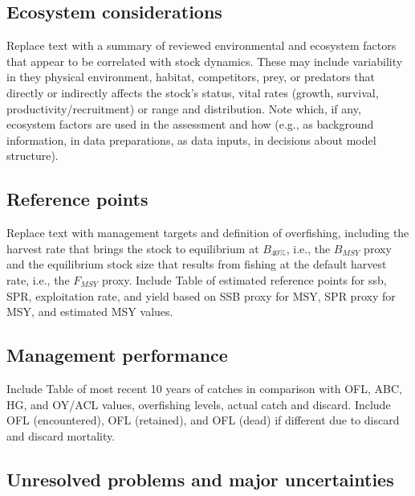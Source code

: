 \documentclass[11pt,
  english,
  letterpaper,
]{article}
\begin{document}
\hypertarget{ecosystem-considerations}{%
\subsection*{Ecosystem considerations}\label{ecosystem-considerations}}

Replace text with a summary of reviewed environmental and ecosystem factors that appear to be correlated with stock dynamics. These may include variability in they physical environment, habitat, competitors, prey, or predators that directly or indirectly affects the stock's status, vital rates (growth, survival, productivity/recruitment) or range and distribution. Note which, if any, ecosystem factors are used in the assessment and how (e.g., as background information, in data preparations, as data inputs, in decisions about model structure).

\hypertarget{reference-points}{%
\subsection*{Reference points}\label{reference-points}}

Replace text with management targets and definition of overfishing, including the harvest rate that brings the stock to equilibrium at \(B_{40\%}\), i.e., the \(B_{MSY}\) proxy and the equilibrium stock size that results from fishing at the default harvest rate, i.e., the \(F_{MSY}\) proxy. Include Table of estimated reference points for ssb, SPR, exploitation rate, and yield based on SSB proxy for MSY, SPR proxy for MSY, and estimated MSY values.

\hypertarget{management-performance}{%
\subsection*{Management performance}\label{management-performance}}

Include Table of most recent 10 years of catches in comparison with OFL, ABC, HG, and OY/ACL values, overfishing levels, actual catch and discard. Include OFL (encountered), OFL (retained), and OFL (dead) if different due to discard and discard mortality.

\hypertarget{unresolved-problems-and-major-uncertainties}{%
\subsection*{Unresolved problems and major uncertainties}\label{unresolved-problems-and-major-uncertainties}}
\end{document}
